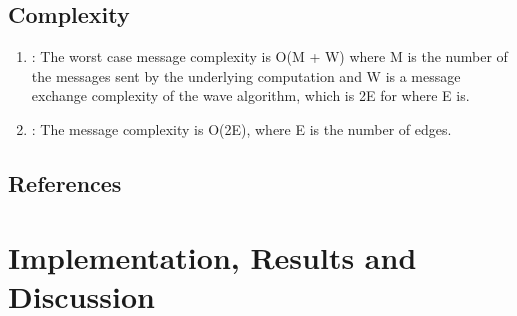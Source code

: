 \documentclass[letterpaper,10pt,english]{sphinxmanual}
\begin{document}
\subsection{Complexity}
\label{\detokenize{docs/ShavitFrancez/algorithm:complexity}}\begin{enumerate}
%
\item {} 
\sphinxAtStartPar
{\hyperref[\detokenize{docs/ShavitFrancez/algorithm:shavitfrancezterminationdetectionalgorithm}]{}}: The worst case message complexity  is O(M + W) where M is the number of the messages sent by the underlying computation and W is a message exchange complexity of the wave algorithm, which is 2E for {\hyperref[\detokenize{docs/ShavitFrancez/algorithm:echoalgorithm}]{}} where E is. 

\item {} 
\sphinxAtStartPar
{\hyperref[\detokenize{docs/ShavitFrancez/algorithm:echoalgorithm}]{}}: The message complexity is O(2E), where E is the number of edges. 

\end{enumerate}


\subsection{References}
\label{\detokenize{docs/ShavitFrancez/algorithm:references}}
\sphinxstepscope


\section{Implementation, Results and Discussion}
\label{\detokenize{docs/ShavitFrancez/results:implementation-results-and-discussion}}\label{\detokenize{docs/ShavitFrancez/results::doc}}
\end{document}
